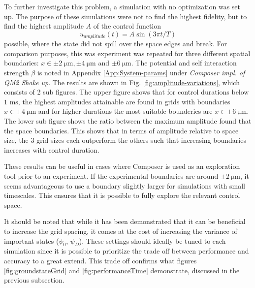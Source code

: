 \documentclass[a4paper, twocolumn]{revtex4-1}
\begin{document}
To further investigate this problem, a simulation with no optimization was set up. The purpose of these simulations were not to find the highest fidelity, but to find the highest amplitude $A$ of the control function
\begin{equation}
	u_{amplitude}(t) = A \sin(3\pi t/T)
	\label{eq:control-amplitude-variation}
\end{equation}
possible, where the state did not spill over the space edges and break. For comparison purposes, this was experiment was repeated for three different spatial boundaries: $x\in \pm \SI{2}{\micro\meter}, \pm \SI{4}{\micro\meter}$ and $\pm \SI{6}{\micro\meter}$. The potential and self interaction strength $\beta$ is noted in Appendix \ref{App:System-params} under \textit{Composer impl. of QM2 Shake up}. The results are shown in Fig. \ref{fig:amplitude-variations}, which consists of 2 sub figures. The upper figure shows that for control durations below $1 \text{ ms}$, the highest amplitudes attainable are found in grids with boundaries $x\in \pm \SI{4}{\micro\meter}$ and for higher durations the most suitable bounderies are $x\in \pm \SI{6}{\micro\meter}$. The lower sub figure shows the ratio between the maximum amplitude found that the space boundaries. This shows that in terms of amplitude relative to space size, the 3 grid sizes each outperform the others such that increasing boundaries increases with control duration. 

These results can be useful in cases where Composer is used as an exploration tool prior to an experiment. If the experimental boundaries are around $\pm \SI{2}{\micro\meter}$, it seems advantageous to use a boundary slightly larger for simulations with small timescales. This ensures that it is possible to fully explore the relevant control space.

It should be noted that while it has been demonstrated that it can be beneficial to increase the grid spacing, it comes at the cost of increasing the variance of important states ($\psi_0$, $\psi_D$). These settings should ideally be tuned to each simulation since it is possible to prioritize the trade off between performance and accuracy to a great extend. This trade off confirms what figures \ref{fig:groundstateGrid} and \ref{fig:performanceTime} demonstrate, discussed in the previous subsection.  
\end{document}

